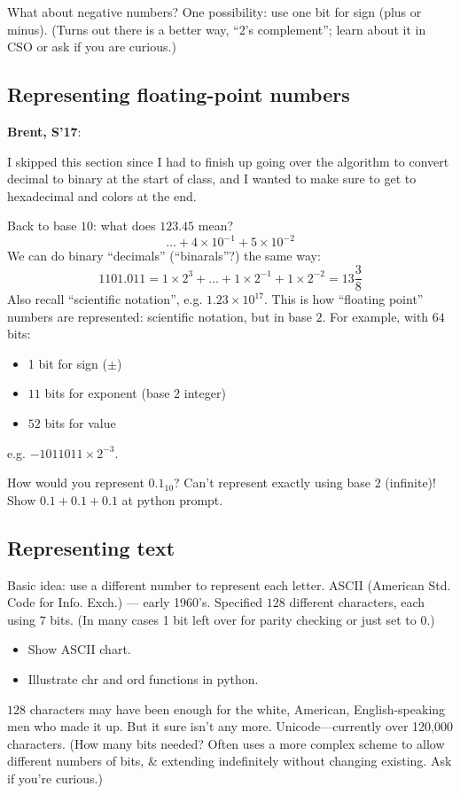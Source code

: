 \documentclass{article}
\newenvironment{reflect}[1]
{
  \noindent
  \begin{lrbox}{\reflectbox}
    \begin{minipage}[t]{\textwidth}
      \textbf{#1}:
}{
    \end{minipage}
  \end{lrbox}
  \fbox{\usebox{\reflectbox}}
}
\begin{document}
What about negative numbers?  One possibility: use one bit for sign
(plus or minus).  (Turns out there is a better way, ``$2$'s
complement''; learn about it in CSO or ask if you are curious.)

\subsection*{Representing floating-point numbers}

\begin{reflect}{Brent, S'17}
  I skipped this section since I had to finish up going over the
  algorithm to convert decimal to binary at the start of class, and I
  wanted to make sure to get to hexadecimal and colors at the end.
\end{reflect}

Back to base $10$: what does $123.45$ mean?
\[ \dots + 4 \times 10^{-1} + 5 \times 10^{-2} \]
We can do binary ``decimals'' (``binarals''?) the same way: \[
1101.011 = 1 \times 2^3 + \dots + 1 \times 2^{-1} + 1 \times 2^{-2} =
13 \frac{3}{8} \]  Also recall ``scientific notation'', e.g. $1.23
\times 10^{17}$.  This is how ``floating point'' numbers are
represented: scientific notation, but in base $2$.  For example, with
$64$ bits:
\begin{itemize}
\item 1 bit for sign ($\pm$)
\item $11$ bits for exponent (base $2$ integer)
\item $52$ bits for value
\end{itemize}
e.g. $-1011011 \times 2^{-3}$.

How would you represent $0.1_{10}$?  Can't represent exactly using
base $2$ (infinite)! Show $0.1 + 0.1 + 0.1$ at python prompt.

\subsection*{Representing text}

Basic idea: use a different number to represent each letter.  ASCII
(American Std. Code for Info. Exch.) --- early 1960's.  Specified
$128$ different characters, each using $7$ bits.  (In many cases 1 bit
left over for parity checking or just set to $0$.)
\begin{itemize}
\item Show ASCII chart.
\item Illustrate chr and ord functions in python.
\end{itemize}
$128$ characters may have been enough for the white, American,
English-speaking men who made it up.  But it sure isn't any more.
Unicode---currently over 120,000 characters. (How many bits needed?
Often uses a more complex scheme to allow different numbers of bits,
\& extending indefinitely without changing existing.  Ask if you're
curious.)
\end{document}

